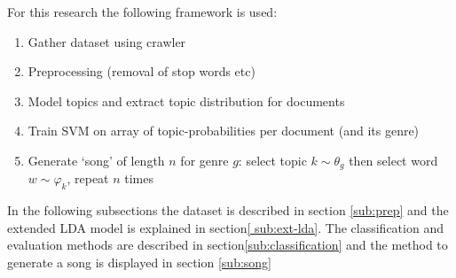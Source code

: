 
For this research the following framework is used:
\begin{enumerate}
	\item Gather dataset using crawler
	\item Preprocessing (removal of stop words etc)
	\item Model topics and extract topic distribution for documents
	\item Train SVM on array of topic-probabilities per document (and its genre)
	\item Generate `song' of length $n$ for genre $g$: select topic $k \sim \theta_g$ then select word $w \sim \varphi_k$, repeat $n$ times
\end{enumerate}

In the following subsections the dataset is described in section \ref{sub:prep} and the extended LDA model is explained in section\ref{ sub:ext-lda}. The classification and evaluation methods are described in section\ref{sub:classification} and the method to generate a song is displayed in section \ref{sub:song}

